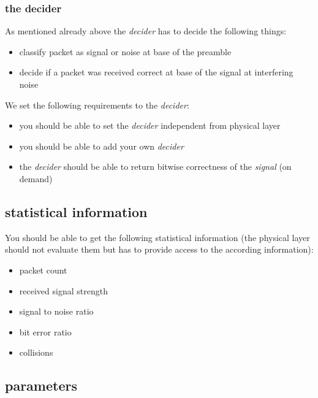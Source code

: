 \subsubsection{the decider}

As mentioned already above the \textit{decider} has to decide the following things:

\begin{itemize}
\item classify packet as signal or noise at base of the preamble
\item decide if a packet was received correct at base of the signal at interfering noise
\end{itemize}

We set the following requirements to the \textit{decider}:

\begin{itemize}
 \item you should be able to set the \textit{decider} independent from physical layer
 \item you should be able to add your own \textit{decider}
 \item the \textit{decider} should be able to return bitwise correctness of the \textit{signal} (on demand)
\end{itemize}


\subsection{statistical information}

You should be able to get the following statistical information (the physical layer should not evaluate them but has to provide access to the according information):

\begin{itemize}
\item packet count
\item received signal strength
\item signal to noise ratio
\item bit error ratio
\item collisions
\end{itemize}

\subsection{parameters}

